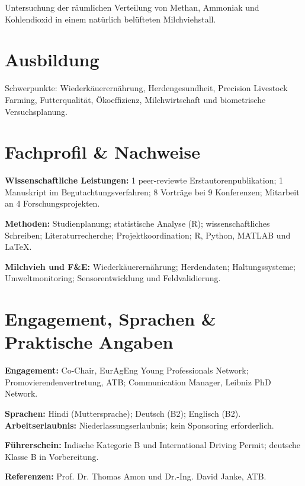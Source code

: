 \begin{cvitems}
  \item Untersuchung der räumlichen Verteilung von Methan, Ammoniak und Kohlendioxid in einem natürlich belüfteten Milchviehstall.
\end{cvitems}

\section*{Ausbildung}
Schwerpunkte: Wiederkäuerernährung, Herdengesundheit, Precision Livestock Farming, Futterqualität, Ökoeffizienz, Milchwirtschaft und biometrische Versuchsplanung.


\section*{Fachprofil \& Nachweise}
\textbf{Wissenschaftliche Leistungen:} 1 peer-reviewte Erstautorenpublikation; 1 Manuskript im Begutachtungsverfahren; 8 Vorträge bei 9 Konferenzen; Mitarbeit an 4 Forschungsprojekten.\par
\textbf{Methoden:} Studienplanung; statistische Analyse (R); wissenschaftliches Schreiben; Literaturrecherche; Projektkoordination; R, Python, MATLAB und LaTeX.\par
\textbf{Milchvieh und F\&E:} Wiederkäuerernährung; Herdendaten; Haltungssysteme; Umweltmonitoring; Sensorentwicklung und Feldvalidierung.

\section*{Engagement, Sprachen \& Praktische Angaben}
\textbf{Engagement:} Co-Chair, EurAgEng Young Professionals Network; Promovierendenvertretung, ATB; Communication Manager, Leibniz PhD Network.\par
\textbf{Sprachen:} Hindi (Muttersprache); Deutsch (B2); Englisch (B2). \quad
\textbf{Arbeitserlaubnis:} Niederlassungserlaubnis; kein Sponsoring erforderlich.\par
\textbf{Führerschein:} Indische Kategorie B und International Driving Permit; deutsche Klasse B in Vorbereitung.\par
\textbf{Referenzen:} Prof. Dr. Thomas Amon und Dr.-Ing. David Janke, ATB.

